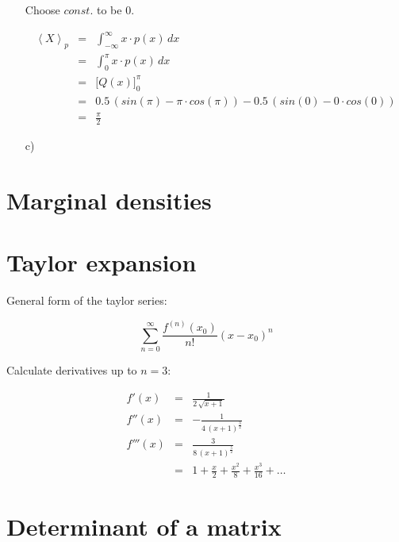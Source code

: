 \documentclass[11pt,a4paper]{article}
\begin{document}
\begin{enumerate}
Choose $const.$ to be $0$.

\begin{eqnarray*}
\left\langle X \right\rangle_p  &   = & \int_{-\infty}^\infty x \cdot p(x) \, dx\\
                                &   = & \int_0^\pi x \cdot p(x) \, dx\\
                                &   = & \Big[ Q(x) \Big]_0^\pi\\
                                &   = & 0.5 \, (sin(\pi) - \pi \cdot cos(\pi)) - 0.5 \, (sin(0) - 0 \cdot cos(0))\\
                                &   = & \frac{\pi}{2}
\end{eqnarray*}

\item[c)]

\end{enumerate}

\section{Marginal densities}

\section{Taylor expansion}

General form of the taylor series:

\begin{displaymath}
\sum_{n=0}^\infty \frac{f^{(n)}(x_0)}{n!} (x - x_0)^n
\end{displaymath}

Calculate derivatives up to $n=3$:

\begin{eqnarray*}
f'(x)   &   = & \frac{1}{2 \, \sqrt{x + 1}}\\
f''(x)  &   = & - \frac{1}{4 \, (x + 1)^\frac{3}{2}}\\
f'''(x) &   = & \frac{3}{8 \, (x + 1)^\frac{5}{2}}\\
        &   = & 1 + \frac{x}{2} + \frac{x^2}{8} + \frac{x^3}{16} + \ldots
\end{eqnarray*}

\section{Determinant of a matrix}
\end{document}
